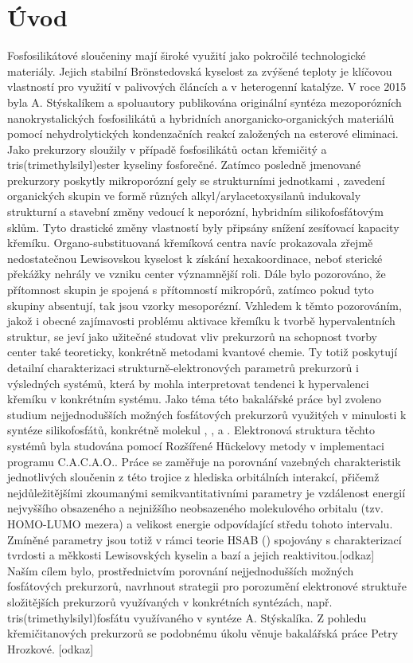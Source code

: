 \documentclass[
  digital, %
  table,   %
  lof,     %
  lot,     %
]{fithesis3}
\begin{document}
\chapter{Úvod}
Fosfosilikátové sloučeniny mají široké využití jako pokročilé technologické materiály. Jejich stabilní Brönstedovská kyselost za zvýšené teploty je klíčovou vlastností pro využití v palivových článcích a v heterogenní katalýze.\cite{korotcenkov2013handbook}\cite{Fougret2001295} V roce 2015 byla A. Stýskalíkem a spoluautory publikována originální syntéza mezoporózních  nanokrystalických  fosfosilikátů a hybridních anorganicko-organických materiálů pomocí nehydrolytických kondenzačních reakcí založených na esterové eliminaci.\cite{1306716} Jako prekurzory sloužily v případě fosfosilikátů octan křemičitý a tris(trimethylsilyl)ester kyseliny fosforečné. Zatímco posledně jmenované prekurzory poskytly mikroporózní gely se strukturními jednotkami , zavedení organických skupin ve formě různých alkyl/arylacetoxysilanů indukovaly strukturní  a stavební změny vedoucí k neporózní, hybridním silikofosfátovým sklům.\cite{1316862} Tyto drastické změny vlastností byly připsány snížení zesíťovací kapacity křemíku. Organo-substituovaná křemíková centra navíc prokazovala zřejmě nedostatečnou Lewisovskou kyselost k získání hexakoordinace, neboť sterické překážky nehrály ve vzniku  center významnější roli.  Dále bylo pozorováno, že přítomnost skupin  je spojená s přítomností mikropórů, zatímco pokud tyto skupiny absentují, tak jsou vzorky mesoporézní.
Vzhledem k těmto pozorováním, jakož i obecné zajímavosti problému aktivace křemíku k tvorbě hypervalentních struktur,\cite{rendler2005hypervalent} se jeví jako užitečné studovat vliv prekurzorů na schopnost tvorby center  také teoreticky, konkrétně metodami kvantové chemie. Ty totiž poskytují detailní charakterizaci strukturně-elektronových parametrů prekurzorů i výsledných systémů, která by mohla interpretovat tendenci k hypervalenci křemíku v konkrétním systému. Jako téma této bakalářské práce byl zvoleno studium nejjednodušších možných fosfátových prekurzorů využitých v minulosti k syntéze silikofosfátů, konkrétně molekul , , a . Elektronová struktura těchto systémů byla studována pomocí Rozšířené Hückelovy metody v implementaci programu C.A.C.A.O.\cite{cacao}. Práce se zaměřuje na porovnání vazebných charakteristik jednotlivých sloučenin z této trojice z hlediska orbitálních interakcí, přičemž nejdůležitějšími zkoumanými semikvantitativními parametry je  vzdálenost energií nejvyššího obsazeného a nejnižšího neobsazeného molekulového orbitalu (tzv. HOMO-LUMO mezera) a velikost energie odpovídající středu tohoto intervalu. Zmíněné parametry jsou totiž v rámci teorie HSAB () spojovány s charakterizací tvrdosti a měkkosti Lewisovských kyselin a bazí a jejich reaktivitou.[odkaz] Naším cílem bylo, prostřednictvím porovnání nejjednodušších možných fosfátových prekurzorů, navrhnout strategii pro porozumění elektronové struktuře složitějších prekurzorů využívaných v konkrétních syntézách, např. tris(trimethylsilyl)fosfátu využívaného v syntéze A. Stýskalíka. Z pohledu křemičitanových prekurzorů se podobnému úkolu věnuje bakalářská práce Petry Hrozkové. [odkaz]
\end{document}
